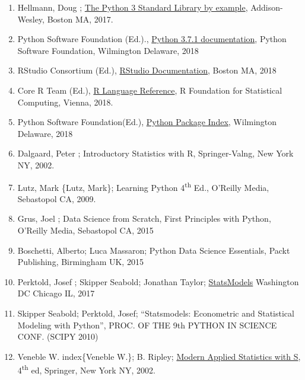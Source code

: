 \documentclass[]{book}
\theoremstyle{definition}
\theoremstyle{definition}
\theoremstyle{definition}
\theoremstyle{remark}
\begin{document}
\begin{enumerate}
\def\labelenumi{\arabic{enumi}.}
\setcounter{enumi}{1}
\item
  Hellmann, Doug ;
  \href{https://www.amazon.com/Python-Standard-Library-Example-Developers-ebook/dp/B072QZZDV7}{The
  Python 3 Standard Library by example}, Addison-Wesley, Boston MA,
  2017.
\item
  Python Software Foundation  (Ed.).,
  \href{https://docs.python.org/3.7/}{Python 3.7.1 documentation},
  Python Software Foundation, Wilmington Delaware, 2018
\item
  RStudio Consortium (Ed.),
  \href{https://support.rstudio.com/hc/en-us/categories/200035113-Documentation}{RStudio
  Documentation}, Boston MA, 2018
\item
  Core R Team (Ed.),
  \href{https://cran.r-project.org/doc/manuals/r-release/R-lang.html}{R
  Language Reference}, R Foundation for Statistical Computing, Vienna,
  2018.
\item
  Python Software Foundation(Ed.), \href{https://pypi.org/}{Python
  Package Index}, Wilmington Delaware, 2018
\item
  Dalgaard, Peter ; Introductory Statistics with
  R, Springer-Valng, New York NY, 2002.
\item
  Lutz, Mark \{Lutz, Mark\}; Learning Python 4\textsuperscript{th} Ed.,
  O'Reilly Media, Sebastopol CA, 2009.
\item
  Grus, Joel ; Data Science from Scratch, First
  Principles with Python, O'Reilly Media, Sebastopol CA, 2015
\item
  Boschetti, Alberto; Luca Massaron; Python Data Science Essentials,
  Packt Publishing, Birmingham UK, 2015
\item
  Perktold, Josef ; Skipper Seabold; Jonathan
  Taylor;
  \href{https://www.statsmodels.org/stable/index.html}{StatsModels}
  Washington DC Chicago IL, 2017
\item
  Skipper Seabold; Perktold, Josef; ``Statsmodels: Econometric and
  Statistical Modeling with Python'', PROC. OF THE 9th PYTHON IN SCIENCE
  CONF. (SCIPY 2010)
\item
  Veneble W. index\{Veneble W.\}; B. Ripley;
  \href{https://www.amazon.com/Modern-Applied-Statistics-Computing-ebook/dp/B000S1LWTE/ref=mt_kindle?_encoding=UTF8\&me=\&qid=1544630778}{Modern
  Applied Statistics with S}, 4\textsuperscript{th} ed, Springer, New
  York NY, 2002.

\end{enumerate}
\end{document}
